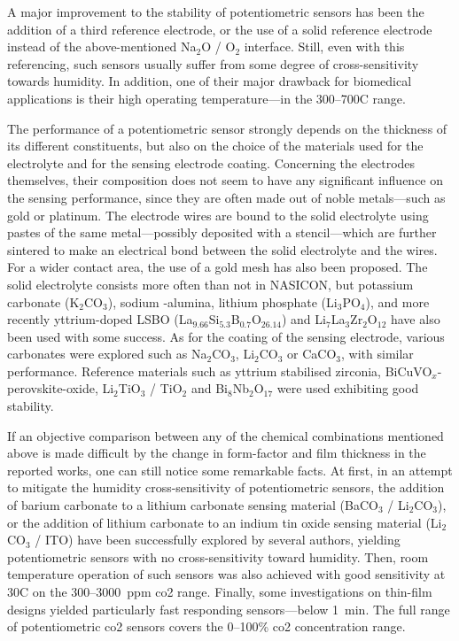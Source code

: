 A major improvement to the stability of potentiometric sensors has been the addition of a third reference electrode\cite{maruyama1987, kishi2007, dang2013}, or the use of a solid reference electrode instead of the above-mentioned Na$_2$O / O$_2$ interface\cite{lee2009li, lee2014, lee2015hk}. Still, even with this referencing, such sensors usually suffer from some degree of cross-sensitivity towards humidity. In addition, one of their major drawback for biomedical applications is their high operating temperature---in the 300--700{\degree}C range.

The performance of a potentiometric sensor strongly depends on the thickness of its different constituents, but also on the choice of the materials used for the electrolyte and for the sensing electrode coating. Concerning the electrodes themselves, their composition does not seem to have any significant influence on the sensing performance, since they are often made out of noble metals---such as gold\cite{maruyama1987, obata2003, kishi2007} or platinum\cite{gauthier1977, kida2001, dang2013}. The electrode wires are bound to the solid electrolyte using pastes of the same metal---possibly deposited with a stencil---which are further sintered to make an electrical bond between the solid electrolyte and the wires. For a wider contact area, the use of a gold mesh has also been proposed\cite{obata2003}. The solid electrolyte consists more often than not in NASICON, but potassium carbonate (K$_2$CO$_3$)\cite{gauthier1977}, sodium \beta-alumina\cite{liu1990}, lithium phosphate (Li$_3$PO$_4$)\cite{lee2009li, lee2014, lee2015hk}, and more recently yttrium-doped LSBO (La$_{9.66}$Si$_{5.3}$B$_{0.7}$O$_{26.14}$)\cite{ma2020} and Li$_7$La$_3$Zr$_2$O$_{12}$\cite{struzik2018} have also been used with some success. As for the coating of the sensing electrode, various carbonates were explored such as Na$_2$CO$_3$, Li$_2$CO$_3$ or CaCO$_3$, with similar performance. Reference materials such as yttrium stabilised zirconia\cite{maruyama1987}, BiCuVO$_x$-perovskite-oxide\cite{kishi2007}, Li$_2$TiO$_3$ / TiO$_2$\cite{lee2009li, lee2014, lee2015hk} and Bi$_8$Nb$_2$O$_{17}$\cite{dang2013} were used exhibiting good stability.

If an objective comparison between any of the chemical combinations mentioned above is made difficult by the change in form-factor and film thickness in the reported works, one can still notice some remarkable facts. At first, in an attempt to mitigate the humidity cross-sensitivity of potentiometric sensors, the addition of barium carbonate to a lithium carbonate sensing material (BaCO$_3$ / Li$_2$CO$_3$)\cite{kishi2007, lee2009li, lee2015hk}, or the addition of lithium carbonate to an indium tin oxide sensing material (Li$_2$CO$_3$ / ITO)\cite{obata2003} have been successfully explored by several authors, yielding potentiometric sensors with no cross-sensitivity toward humidity. Then, room temperature operation of such sensors was also achieved with good sensitivity at 30{\degree}C on the 300--3000~ppm \gls{co2} range\cite{obata2003}. Finally, some investigations on thin-film designs yielded particularly fast responding sensors---below 1~min\cite{choi2013, lee2014, lee2015hk}. The full range of potentiometric \gls{co2} sensors covers the 0--100\% \gls{co2} concentration range.

